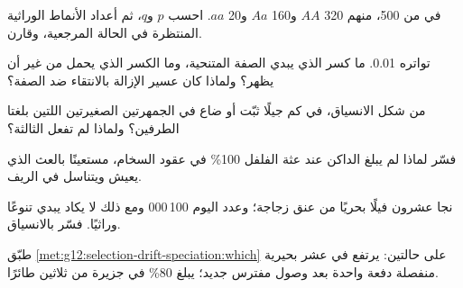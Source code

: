 \begin{exercise}[$\star\star$]\label{exo:g12:selection-drift-speciation:6}
في  من 500، منهم 320 $AA$ و160 $Aa$ و20 $aa$. احسب $p$ و$q$، ثم
أعداد الأنماط الوراثية المنتظرة في الحالة المرجعية، وقارن.
\end{exercise}

\begin{exercise}[$\star\star$]\label{exo:g12:selection-drift-speciation:7}
  تواتره 0.01. ما كسر  الذي يبدي الصفة المتنحية، وما
الكسر الذي يحمل  من غير أن يظهر؟ ولماذا كان  عسير الإزالة
بالانتقاء ضد الصفة؟
\end{exercise}

\begin{exercise}[$\star\star$]\label{exo:g12:selection-drift-speciation:8}
من شكل الانسياق، في كم جيلًا ثبّت  أو ضاع في الجمهرتين الصغيرتين
اللتين بلغتا الطرفين؟ ولماذا لم تفعل الثالثة؟
\end{exercise}

\begin{exercise}[$\star\star$]\label{exo:g12:selection-drift-speciation:9}
فسّر لماذا لم يبلغ  الداكن عند عثة الفلفل 100\% في عقود السخام،
مستعينًا بالعث الذي يعيش ويتناسل في الريف.
\end{exercise}

\begin{exercise}[$\star\star$]\label{exo:g12:selection-drift-speciation:10}
نجا عشرون فيلًا بحريًا من عنق زجاجة؛ وعدد  اليوم 100\,000 ومع
ذلك لا يكاد يبدي تنوعًا وراثيًا. فسّر بالانسياق.
\end{exercise}

\begin{exercise}[$\star\star$]\label{exo:g12:selection-drift-speciation:11}
طبّق \cref{met:g12:selection-drift-speciation:which} على حالتين: 
يرتفع في عشر  بحيرية منفصلة دفعة واحدة بعد وصول مفترس جديد؛
 يبلغ 80\% في  جزيرة من ثلاثين طائرًا.
\end{exercise}

